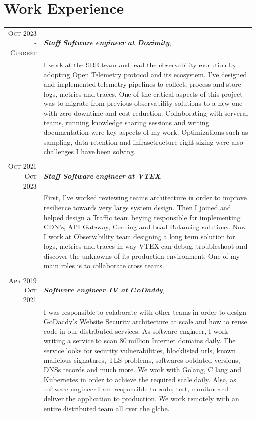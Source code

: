 \documentclass[a4paper,10pt]{article} %
\begin{document}
\section{Work Experience}

\begin{longtable}{r|p{11cm}}

\textsc{Oct 2023 - Current} & \emph{\bf Staff Software engineer at Doximity}, \\
& \footnotesize{
    I work at the SRE team and lead the observability evolution by adopting
    Open Telemetry protocol and its ecosystem. I've designed and implemented
    telemetry pipelines to collect, process and store logs, metrics and traces.
    One of the critical aspects of this project was to migrate from previous observability
    solutions to a new one with zero downtime and cost reduction. Collaborating with
    serveral teams, running knowledge sharing sessions and writing documentation were key 
    aspects of my work. Optimizations such as sampling, data retention and infrasctructure
    right sizing were also challenges I have been solving.
  } \\
\multicolumn{2}{c}{} \\

\textsc{Oct 2021 - Oct 2023} & \emph{\bf Staff Software engineer at VTEX}, \\
& \footnotesize{
    First, I've worked reviewing teams architecture in order to improve
    resilience towards very large system design. Then I joined and helped
    design a Traffic team beying responsible for implementing CDN's,
    API Gateway, Caching and Load Balancing solutions. Now I work at
    Observability team designing a long term solution for logs, metrics and
    traces in way VTEX can debug, troubleshoot and discover the unknowns of its
    production environment. One of my main roles is to collaborate cross teams.
  } \\
\multicolumn{2}{c}{} \\

\textsc{Apr 2019 - Oct 2021} & \emph{\bf Software engineer IV at GoDaddy}, \\
& \footnotesize{
    I was responsible to colaborate with other teams in order to design
    GoDaddy's Website Security architecture at scale and how to reuse code
    in our distributed services.
    As software engineer, I work  writing a service to scan
    80 million Internet domains daily. The service looks for security
    vulnerabilities, blocklisted urls, known malicious signatures,
    TLS problems, softwares outdated versions, DNSs records and much more.
    We work with Golang, C lang and Kubernetes in order to achieve the
    required scale daily. Also, as software engineer I am responsible to code,
    test, monitor and deliver the application to production.
    We work remotely with an entire distributed team all over the globe.} \\
\multicolumn{2}{c}{} \\


\end{longtable}
\end{document}
